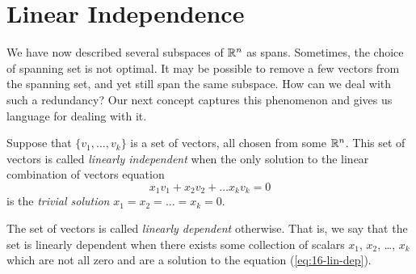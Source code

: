 \documentclass[elementsmain.tex]{subfiles}
\begin{document}
\section{Linear Independence}

We have now described several subspaces of $\mathbb{R}^n$ as spans. Sometimes, the choice of spanning set is not optimal. It may be possible to remove a few vectors from the spanning set, and yet still span the same subspace. How can we deal with such a redundancy? Our next concept captures this phenomenon and gives us language for dealing with it.


\begin{definition}
Suppose that $\{ v_1, \dots, v_k\}$ is a set of vectors, all chosen from some $\mathbb{R}^n$. This set of vectors is called \emph{linearly independent} when the only solution to the linear combination of vectors equation
\begin{equation}\label{eq:16-lin-dep}
x_1 v_1 + x_2 v_2 + \dots x_k v_k = 0
\end{equation}
is the \emph{trivial solution} $x_1 = x_2 = \dots = x_k = 0$.

The set of vectors is called \emph{linearly dependent} otherwise. That is, we say that the set is linearly dependent when there exists some collection of scalars $x_1$, $x_2$, \dots, $x_k$ which are not all zero and are a solution to the equation (\ref{eq:16-lin-dep}).
\end{definition}
\end{document}
